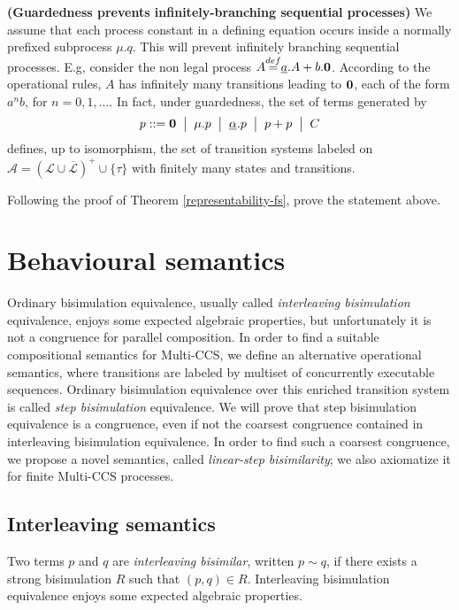\begin{remark}\label{guarded-rec}{\bf (Guardedness prevents infinitely-branching sequential processes)} 
We assume that each process constant in a defining equation occurs
inside a normally prefixed subprocess $\mu.q$. This will prevent infinitely branching sequential processes.
E.g, consider the non legal process $A  {\mbox{${\stackrel{def}{=}}$}}  \underline{a}.A + b.\mbox{\bf 0}$.
According to the operational rules, $A$ has infinitely many transitions leading to $\mbox{\bf 0}$, each of the form $a^nb$, for 
$n = 0, 1, ...$. 
In fact, under guardedness, the set of terms generated by 
\[ p ::= \mbox{\bf 0} \;\;\big|\;\;  \mu.p \;\;\big|\;\;  \underline{\alpha}.p \;\;\big|\;\; p+p  \;\;\big|\;\;  C\]
defines, up to isomorphism, the set of transition systems labeled on ${\mathcal A} = 
(\mathcal{L} \cup \overline{\mathcal L})^+ \cup \{\tau\}$ with finitely many states and transitions.
\fine
\end{remark}

\begin{exercise}
Following the proof of Theorem \ref{representability-fs}, prove the statement above.
\fine
\end{exercise}


\section{Behavioural semantics}

Ordinary bisimulation equivalence, usually called {\em interleaving bisimulation} equivalence, 
enjoys some expected algebraic properties, but unfortunately it
is not a congruence for parallel composition. In order to find a suitable compositional semantics for 
Multi-CCS,  we define an alternative operational
semantics, where transitions are labeled by multiset of concurrently executable sequences. Ordinary bisimulation
equivalence 
over this enriched transition system is called {\em step bisimulation} equivalence. 
We will prove that step bisimulation equivalence is a congruence, even if not the coarsest congruence 
contained in interleaving bisimulation equivalence. In order to find such a coarsest congruence,
we propose a novel semantics, called {\em linear-step bisimilarity}; we also axiomatize it for 
finite Multi-CCS processes.

\subsection{Interleaving semantics}

Two terms $p$ and $q$ are {\em interleaving bisimilar}, written
$p\sim q$, if there exists a strong bisimulation $R$ such that $(p,q)\in R$.
Interleaving bisimulation equivalence enjoys some expected algebraic properties. 


